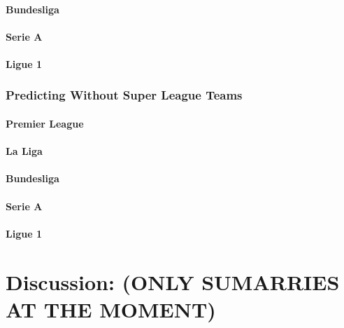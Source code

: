 \documentclass[
]{article}
\begin{document}
\hypertarget{bundesliga-1}{%
\paragraph{Bundesliga}\label{bundesliga-1}}

\hypertarget{serie-a-1}{%
\paragraph{Serie A}\label{serie-a-1}}

\hypertarget{ligue-1-1}{%
\paragraph{Ligue 1}\label{ligue-1-1}}

\hypertarget{predicting-without-super-league-teams}{%
\subsubsection{Predicting Without Super League
Teams}\label{predicting-without-super-league-teams}}

\hypertarget{premier-league-2}{%
\paragraph{Premier League}\label{premier-league-2}}

\hypertarget{la-liga-2}{%
\paragraph{La Liga}\label{la-liga-2}}

\hypertarget{bundesliga-2}{%
\paragraph{Bundesliga}\label{bundesliga-2}}

\hypertarget{serie-a-2}{%
\paragraph{Serie A}\label{serie-a-2}}

\hypertarget{ligue-1-2}{%
\paragraph{Ligue 1}\label{ligue-1-2}}

\hypertarget{discussion-only-sumarries-at-the-moment}{%
\section{Discussion: (ONLY SUMARRIES AT THE
MOMENT)}\label{discussion-only-sumarries-at-the-moment}}
\end{document}
